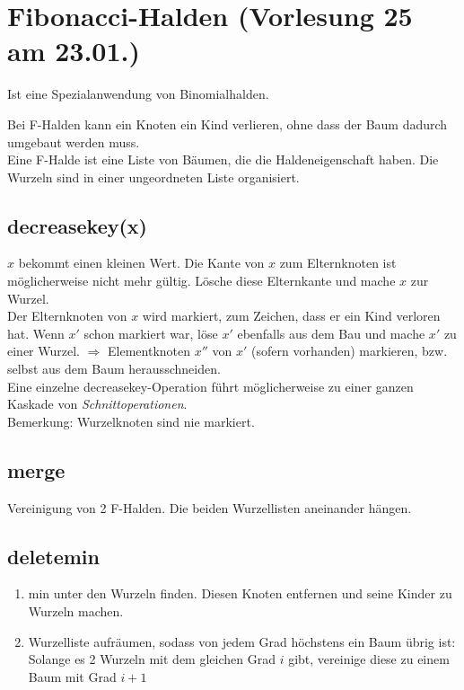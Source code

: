 \section{ Fibonacci-Halden \tiny (Vorlesung 25 am 23.01.)}
Ist eine Spezialanwendung von Binomialhalden.

Bei F-Halden kann ein Knoten ein Kind verlieren, ohne dass der Baum dadurch umgebaut werden muss.\\

Eine F-Halde ist eine Liste von Bäumen, die die Haldeneigenschaft haben. Die Wurzeln sind in einer ungeordneten Liste organisiert.\\

\subsection{decreasekey(x)} $x$ bekommt einen kleinen Wert. Die Kante von $x$ zum Elternknoten ist möglicherweise nicht mehr gültig. Lösche diese Elternkante und mache $x$ zur Wurzel.\\
Der Elternknoten von $x$ wird markiert, zum Zeichen, dass er ein Kind verloren hat. Wenn $x'$ schon markiert war, löse $x'$ ebenfalls aus dem Bau und mache $x'$ zu einer Wurzel. $\Rightarrow$ Elementknoten $x''$ von $x'$ (sofern vorhanden) markieren, bzw. selbst aus dem Baum herausschneiden.\\ 
Eine einzelne decreasekey-Operation führt möglicherweise zu einer ganzen Kaskade von \emph{Schnittoperationen}.\\
Bemerkung: Wurzelknoten sind nie markiert.
\subsection{merge}
Vereinigung von 2 F-Halden. Die beiden Wurzellisten aneinander hängen.\\
\subsection{deletemin}
\begin{enumerate}
\item min unter den Wurzeln finden. Diesen Knoten entfernen und seine Kinder zu Wurzeln machen. 
\item Wurzelliste aufräumen, sodass von jedem Grad höchstens ein Baum übrig ist: \\
Solange es 2 Wurzeln mit dem gleichen Grad $i$ gibt, vereinige diese zu einem Baum mit Grad $i+1$\\
\end{enumerate}

